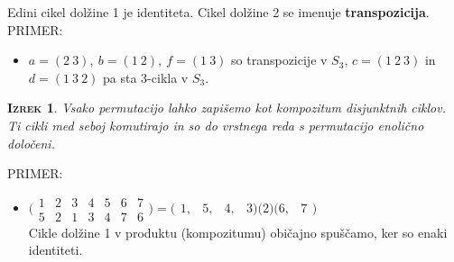\documentclass[a4paper,12pt]{article}
\newtheorem*{izrek}{\textsc{Izrek}}
\begin{document}
\noindent Edini cikel dolžine 1 je identiteta. Cikel dolžine 2 se imenuje \textbf{transpozicija}. \\

\noindent PRIMER:
\begin{itemize}
\item $a=(2~3),~b=(1~2),~f=(1~3)$ so transpozicije v $S_3$, $c=(1~2~3)$ in $d=(1~3~2)$ pa sta 3-cikla v $S_3$.\\
\end{itemize}

\begin{izrek}
Vsako permutacijo lahko zapišemo kot kompozitum disjunktnih ciklov. Ti cikli med seboj komutirajo in so do vrstnega reda s permutacijo enolično določeni.\\
\end{izrek}

\noindent PRIMER:
\begin{itemize}
\item 
$
\bigl(
\begin{smallmatrix}
1 & 2 & 3 & 4 & 5 & 6 & 7 \\
5 & 2 & 1 & 3 & 4 & 7 & 6
\end{smallmatrix}
\bigr)
= 
\bigl(
\begin{smallmatrix}
1,&5,&4,&3\bigr)\bigl(2\bigr)\bigl(6,&7
\end{smallmatrix}\bigr)$ \\

Cikle dolžine 1 v produktu (kompozitumu) običajno spuščamo, ker so enaki identiteti.\\
\end{itemize}

\newpage 
\end{document}
